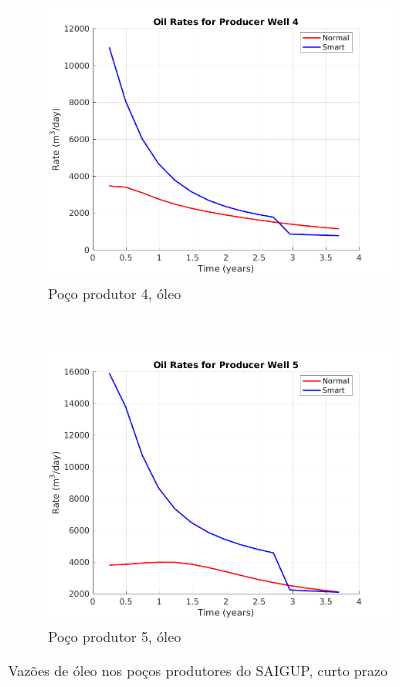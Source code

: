 \begin{figure}[!ht]
	\begin{subfigure}[b]{.3\textwidth}
		\includegraphics[width=\textwidth]{figs/resultadosSSAIGUP/SSAIGUP_OilWell4_Zoom}
		\caption{Po\c{c}o produtor 4, \'{o}leo}
		\label{SSAIGUP_OilWell4}
	\end{subfigure}
	~
	\begin{subfigure}[b]{.3\textwidth}
		\includegraphics[width=\textwidth]{figs/resultadosSSAIGUP/SSAIGUP_OilWell5_Zoom}
		\caption{Po\c{c}o produtor 5, \'{o}leo}
		\label{SSAIGUP_OilWell5}
	\end{subfigure}
\caption{Vaz\~{o}es de \'{o}leo nos po\c{c}os produtores do SAIGUP, curto prazo}
\label{SSAIGUP_OilRates}
\end{figure}

